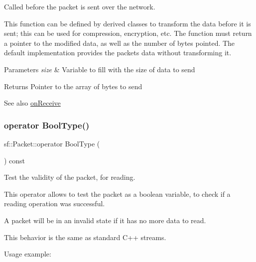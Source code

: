 Called before the packet is sent over the network. 

This function can be defined by derived classes to transform the data before it is sent; this can be used for compression, encryption, etc. The function must return a pointer to the modified data, as well as the number of bytes pointed. The default implementation provides the packet\textquotesingle{}s data without transforming it.


\begin{DoxyParams}{Parameters}
{\em size} & Variable to fill with the size of data to send\\
\hline
\end{DoxyParams}
\begin{DoxyReturn}{Returns}
Pointer to the array of bytes to send
\end{DoxyReturn}
\begin{DoxySeeAlso}{See also}
\mbox{\hyperlink{classsf_1_1_packet_ab71a31ef0f1d5d856de6f9fc75434128}{on\+Receive}} \begin{DoxyVerb}\end{DoxyVerb}
 
\end{DoxySeeAlso}
\mbox{\label{classsf_1_1_packet_a8ab20be4a63921b7cb1a4d8ca5c30f75}} 
\subsubsection{\texorpdfstring{operator BoolType()}{operator BoolType()}}
{\footnotesize\ttfamily sf\+::\+Packet\+::operator Bool\+Type (\begin{DoxyParamCaption}{ }\end{DoxyParamCaption}) const}



Test the validity of the packet, for reading. 

This operator allows to test the packet as a boolean variable, to check if a reading operation was successful.

A packet will be in an invalid state if it has no more data to read.

This behavior is the same as standard C++ streams.

Usage example\+: 
\begin{DoxyCode}{0}
\DoxyCodeLine{\{}
\DoxyCodeLine{   \textcolor{comment}{// ok, x was extracted successfully}}
\DoxyCodeLine{\}}
\DoxyCodeLine{}
\DoxyCodeLine{\textcolor{comment}{// -- or --}}
\DoxyCodeLine{}
\DoxyCodeLine{\{}
\DoxyCodeLine{   \textcolor{comment}{// ok, x was extracted successfully}}
\DoxyCodeLine{\}}
\end{DoxyCode}


